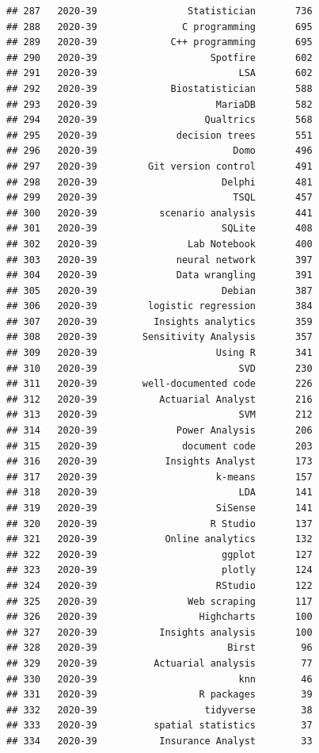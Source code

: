\documentclass[
]{article}
\begin{document}
\begin{verbatim}
## 287   2020-39                Statistician       736
## 288   2020-39               C programming       695
## 289   2020-39             C++ programming       695
## 290   2020-39                    Spotfire       602
## 291   2020-39                         LSA       602
## 292   2020-39             Biostatistician       588
## 293   2020-39                     MariaDB       582
## 294   2020-39                   Qualtrics       568
## 295   2020-39              decision trees       551
## 296   2020-39                        Domo       496
## 297   2020-39         Git version control       491
## 298   2020-39                      Delphi       481
## 299   2020-39                        TSQL       457
## 300   2020-39           scenario analysis       441
## 301   2020-39                      SQLite       408
## 302   2020-39                Lab Notebook       400
## 303   2020-39              neural network       397
## 304   2020-39              Data wrangling       391
## 305   2020-39                      Debian       387
## 306   2020-39         logistic regression       384
## 307   2020-39          Insights analytics       359
## 308   2020-39        Sensitivity Analysis       357
## 309   2020-39                     Using R       341
## 310   2020-39                         SVD       230
## 311   2020-39        well-documented code       226
## 312   2020-39           Actuarial Analyst       216
## 313   2020-39                         SVM       212
## 314   2020-39              Power Analysis       206
## 315   2020-39               document code       203
## 316   2020-39            Insights Analyst       173
## 317   2020-39                     k-means       157
## 318   2020-39                         LDA       141
## 319   2020-39                     SiSense       141
## 320   2020-39                    R Studio       137
## 321   2020-39            Online analytics       132
## 322   2020-39                      ggplot       127
## 323   2020-39                      plotly       124
## 324   2020-39                     RStudio       122
## 325   2020-39                Web scraping       117
## 326   2020-39                  Highcharts       100
## 327   2020-39           Insights analysis       100
## 328   2020-39                       Birst        96
## 329   2020-39          Actuarial analysis        77
## 330   2020-39                         knn        46
## 331   2020-39                  R packages        39
## 332   2020-39                   tidyverse        38
## 333   2020-39          spatial statistics        37
## 334   2020-39           Insurance Analyst        33

\end{verbatim}
\end{document}
